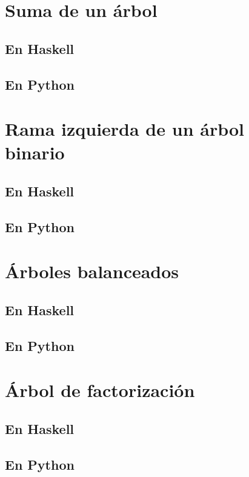 \documentclass[a4paper,12pt,twoside]{book}
\begin{document}
\section{Suma de un árbol}
\subsection{En Haskell}
\subsection{En Python}

\section{Rama izquierda de un árbol binario}
\subsection{En Haskell}
\subsection{En Python}

\section{Árboles balanceados}
\subsection{En Haskell}
\subsection{En Python}

\section{Árbol de factorización}
\subsection{En Haskell}
\subsection{En Python}
\end{document}
